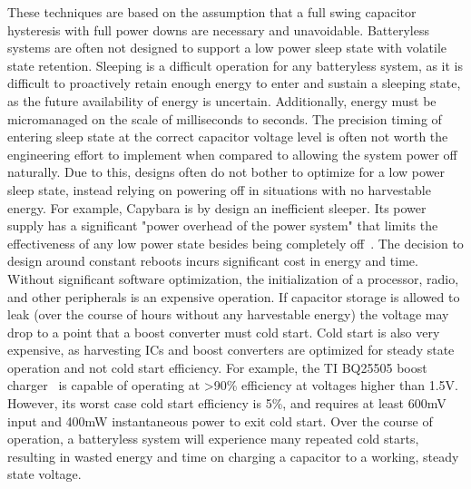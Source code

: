These techniques are based on the assumption that a full swing capacitor hysteresis with full power downs are necessary and unavoidable. Batteryless systems are often not designed to support a low power sleep state with volatile state retention. 
Sleeping is a difficult operation for any batteryless system, as it is difficult to proactively retain enough energy to enter and sustain a sleeping state, as the future availability of energy is uncertain. 
Additionally, energy must be micromanaged on the scale of milliseconds to seconds. 
The precision timing of entering sleep state at the correct capacitor voltage level is often not worth the engineering effort to implement when compared to allowing the system power off naturally. 
Due to this, designs often do not bother to optimize for a low power sleep state, instead relying on powering off in situations with no harvestable energy. 
For example, Capybara is by design an inefficient sleeper. Its power supply has a significant
"power overhead of the power system" that limits the effectiveness of
any low power state besides being completely off~\cite{colinReconfigurable18}.
The decision to design around constant reboots incurs significant cost in energy and time. Without significant software optimization, the initialization of a processor, radio, and other peripherals is an expensive operation. If capacitor storage is allowed to leak (over the course of hours without any harvestable energy) the voltage may drop to a point that a boost converter must cold start. 
Cold start is also very expensive, as harvesting ICs and boost converters are optimized for steady state operation and not cold start efficiency. 
For example, the TI BQ25505 boost charger~\cite{bq25505} is capable of operating at \textgreater90\% efficiency at voltages higher than 1.5\si{\volt}. 
However, its worst case cold start efficiency is 5\%, and requires at least 600\si{\milli\volt} input and 400\si{\milli\watt} instantaneous power to exit cold start.
Over the course of operation, a batteryless system will experience many repeated cold starts, resulting in wasted energy and time on charging a capacitor to a working, steady state voltage.

